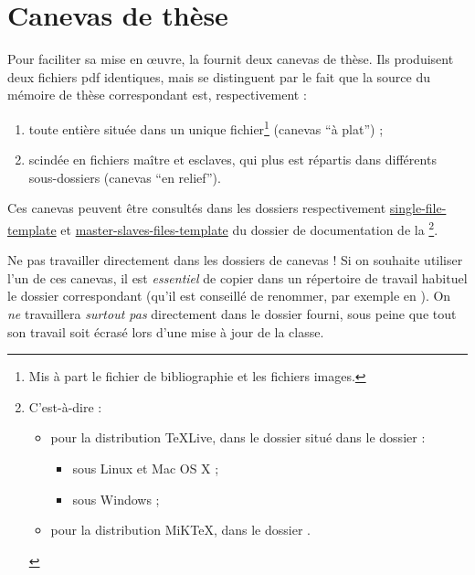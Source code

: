 \chapter{Canevas de thèse}\label{cha:canevas}

Pour faciliter sa mise en œuvre, la \yatcl fournit deux canevas de thèse. Ils
produisent deux fichiers \gls{pdf} identiques, mais se distinguent par le fait
que la source  du mémoire de thèse correspondant est,
respectivement :
\begin{enumerate}
\item toute entière située dans un unique fichier\footnote{Mis à part le
    fichier de bibliographie et les fichiers images.} (canevas \enquote{à
    plat}) ;
\item scindée en fichiers maître et esclaves, qui plus est répartis dans
  différents sous-dossiers (canevas \enquote{en relief}).
\end{enumerate}

Ces canevas peuvent être consultés dans les dossiers respectivement
\href{single-file-template/.}{single-file-template} et
\href{master-slaves-files-template/.}{master-slaves-files-template} du dossier
de documentation de la \yatcl{}\footnote{C'est-à-dire :
  \begin{itemize}
  \item pour la distribution \TeX Live, dans le dossier
    \tldistdirectory\jobdocdirectory{} situé dans le dossier :
    \begin{itemize}
    \item \unixtldirectory{} sous Linux et Mac OS X ;
    \item \wintldirectory{} sous Windows ;
    \end{itemize}
  \item pour la distribution MiK\TeX, dans le dossier \miktexdistdirectory.
  \end{itemize}
}.

\begin{dbwarning}{Ne pas travailler directement dans les dossiers de canevas !}{}
  Si on souhaite utiliser l'un de ces canevas, il est \emph{essentiel} de
  copier dans un répertoire de travail habituel le dossier correspondant (qu'il
  est conseillé de renommer, par exemple en ). On \emph{ne}
  travaillera \emph{surtout pas} directement dans le dossier fourni, sous peine
  que tout son travail soit écrasé lors d'une mise à jour de la classe.
\end{dbwarning}

